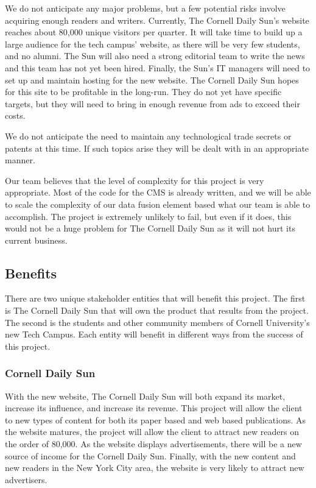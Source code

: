\documentclass[11pt]{article} %
\begin{document}
We do not anticipate any major problems, but a few potential risks involve acquiring enough readers and writers. Currently, The Cornell Daily Sun’s website reaches about 80,000 unique visitors per quarter. It will take time to build up a large audience for the tech campus’ website, as there will be very few students, and no alumni. The Sun will also need a strong editorial team to write the news and this team has not yet been hired. Finally, the Sun’s IT managers will need to set up and maintain hosting for the new website. The Cornell Daily Sun hopes for this site to be profitable in the long-run. They do not yet have specific targets, but they will need to bring in enough revenue from ads to exceed their costs.

We do not anticipate the need to maintain any technological trade secrets or patents at this time. If such topics arise they will be dealt with in an appropriate manner.

Our team believes that the level of complexity for this project is very appropriate. Most of the code for the CMS is already written, and we will be able to scale the complexity of our data fusion element based what our team is able to accomplish. The project is extremely unlikely to fail, but even if it does, this would not be a huge problem for The Cornell Daily Sun as it will not hurt its current business.

\subsection{Benefits}

There are two unique stakeholder entities that will benefit this project. The first is The Cornell Daily Sun that will own the product that results from the project. The second is the students and other community members of Cornell University’s new Tech Campus. Each entity will benefit in different ways from the success of this project.
                   
\subsubsection{Cornell Daily Sun}
                   
With the new website, The Cornell Daily Sun will both expand its market, increase its influence, and increase its revenue. This project will allow the client to new types of content for both its paper based and web based publications. As the website matures, the project will allow the client to attract new readers on the order of 80,000. As the website displays advertisements, there will be a new source of income for the Cornell Daily Sun. Finally, with the new content and new readers in the New York City area, the website is very likely to attract new advertisers.
                   
\end{document}
